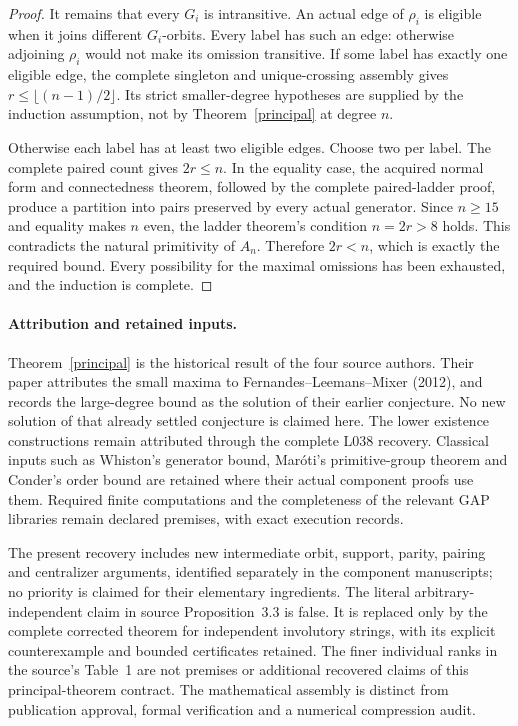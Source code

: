 \documentclass[11pt,a4paper]{article}
\begin{document}
\begin{proof}
It remains that every $G_i$ is intransitive. An actual edge of
$\rho_i$ is eligible when it joins different $G_i$-orbits.
Every label has such an edge: otherwise adjoining $\rho_i$
would not make its omission transitive. If some label has exactly
one eligible edge, the complete singleton and unique-crossing
assembly gives $r\le\lfloor(n-1)/2\rfloor$. Its strict
smaller-degree hypotheses are supplied by the induction assumption,
not by Theorem~\ref{principal} at degree $n$.

Otherwise each label has at least two eligible edges. Choose two
per label. The complete paired count gives $2r\le n$. In the
equality case, the acquired normal form and connectedness theorem,
followed by the complete paired-ladder proof, produce a partition
into pairs preserved by every actual generator. Since $n\ge15$
and equality makes $n$ even, the ladder theorem's condition
$n=2r>8$ holds. This contradicts the natural primitivity of
$A_n$. Therefore $2r<n$, which is exactly the required bound.
Every possibility for the maximal omissions has been exhausted,
and the induction is complete.
\end{proof}

\paragraph{Attribution and retained inputs.}
Theorem~\ref{principal} is the historical result of the four source
authors. Their paper attributes the small maxima to
Fernandes--Leemans--Mixer (2012), and records the large-degree
bound as the solution of their earlier conjecture. No new solution
of that already settled conjecture is claimed here. The lower
existence constructions remain attributed through the complete
L038 recovery. Classical inputs such as Whiston's generator bound,
Mar\'oti's primitive-group theorem and Conder's order bound are
retained where their actual component proofs use them. Required
finite computations and the completeness of the relevant GAP
libraries remain declared premises, with exact execution records.

The present recovery includes new intermediate orbit, support,
parity, pairing and centralizer arguments, identified separately
in the component manuscripts; no priority is claimed for their
elementary ingredients. The literal arbitrary-independent claim
in source Proposition~3.3 is false. It is replaced only by the
complete corrected theorem for independent involutory strings,
with its explicit counterexample and bounded certificates retained.
The finer individual ranks in the source's Table~1 are not premises
or additional recovered claims of this principal-theorem contract.
The mathematical assembly is distinct from publication approval,
formal verification and a numerical compression audit.
\end{document}
